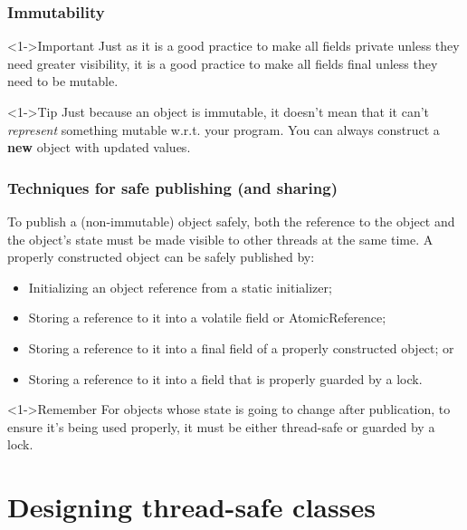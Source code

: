 \documentclass[xcolor={dvipsnames,svgnames},aspectratio=169]{beamer}
\begin{document}
\begin{frame}[fragile]
  \frametitle{Immutability}

  \begin{block}<1->{\faBriefcaseMedical\quad Important}
    Just as it is a good practice to make all fields private unless they need
    greater visibility, it is a good practice to make all fields final
    unless they need to be mutable.
  \end{block}
  \pause
  \vspace{0.2cm}
  \begin{block}<1->{\faLightbulb\quad Tip}
    Just because an object is immutable, it doesn't mean that it can't \emph{represent}
    something mutable w.r.t. your program. You can always construct a
    \textbf{new} object with updated values.
  \end{block}
\end{frame}

\begin{frame}[fragile]
  \frametitle{Techniques for safe publishing (and sharing)}

  To publish a (non-immutable) object safely, both the reference to the object
  and the object’s state must be made visible to other threads at the same time. A properly
  constructed object can be safely published by:
  \begin{itemize}
  \item[\faBook] Initializing an object reference from a static initializer;
  \item[\faBook] Storing a reference to it into a volatile field or AtomicReference;
  \item[\faBook] Storing a reference to it into a final field of a properly constructed
    object; or
  \item[\faBook] Storing a reference to it into a field that is properly guarded by a
    lock.
  \end{itemize}

  \begin{block}<1->{\faBook\quad Remember}
    For objects whose state is going to change after publication, to ensure it's
    being used properly, it must be either thread-safe or guarded by a lock.
  \end{block}
\end{frame}

\section{Designing thread-safe classes}
\end{document}
